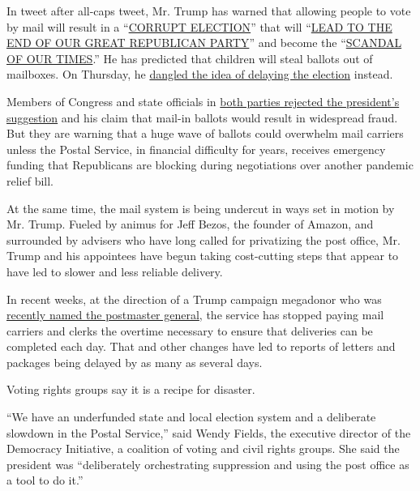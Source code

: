 In tweet after all-caps tweet, Mr. Trump has warned that allowing people
to vote by mail will result in a
``\href{https://twitter.com/realDonaldTrump/status/1285540318503407622?s=20}{CORRUPT
ELECTION}'' that will
``\href{https://twitter.com/realDonaldTrump/status/1266172570983940101?s=20}{LEAD
TO THE END OF OUR GREAT REPUBLICAN PARTY}'' and become the
``\href{https://twitter.com/realDonaldTrump/status/1275024974579982336?s=20}{SCANDAL
OF OUR TIMES}.'' He has predicted that children will steal ballots out
of mailboxes. On Thursday, he
\href{https://twitter.com/realDonaldTrump/status/1288818160389558273}{dangled
the idea of delaying the election} instead.

Members of Congress and state officials in
\href{https://www.nytimes3xbfgragh.onion/2020/07/30/us/politics/trump-delay-2020-election.html}{both
parties rejected the president's suggestion} and his claim that mail-in
ballots would result in widespread fraud. But they are warning that a
huge wave of ballots could overwhelm mail carriers unless the Postal
Service, in financial difficulty for years, receives emergency funding
that Republicans are blocking during negotiations over another pandemic
relief bill.

At the same time, the mail system is being undercut in ways set in
motion by Mr. Trump. Fueled by animus for Jeff Bezos, the founder of
Amazon, and surrounded by advisers who have long called for privatizing
the post office, Mr. Trump and his appointees have begun taking
cost-cutting steps that appear to have led to slower and less reliable
delivery.

In recent weeks, at the direction of a Trump campaign megadonor who was
\href{https://www.nytimes3xbfgragh.onion/2020/05/07/us/politics/postmaster-general-louis-dejoy.html}{recently
named the postmaster general}, the service has stopped paying mail
carriers and clerks the overtime necessary to ensure that deliveries can
be completed each day. That and other changes have led to reports of
letters and packages being delayed by as many as several days.

Voting rights groups say it is a recipe for disaster.

``We have an underfunded state and local election system and a
deliberate slowdown in the Postal Service,'' said Wendy Fields, the
executive director of the Democracy Initiative, a coalition of voting
and civil rights groups. She said the president was ``deliberately
orchestrating suppression and using the post office as a tool to do
it.''

